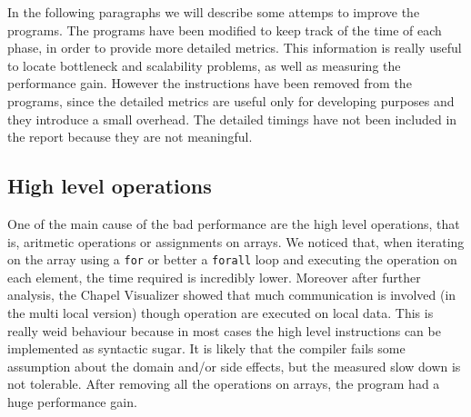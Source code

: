 \documentclass{article}
\begin{document}

In the following paragraphs we will describe some attemps to improve the programs. The programs have been modified to keep track of the time of each phase, in order to provide more detailed metrics. This information is really useful to locate bottleneck and scalability problems, as well as measuring the performance gain. However the instructions have been removed from the programs, since the detailed metrics are useful only for developing purposes and they introduce a small overhead. The detailed timings have not been included in the report because they are not meaningful.

\subsection{High level operations}
One of the main cause of the bad performance are the high level operations, that is, aritmetic operations or assignments on arrays. We noticed that, when iterating on the array using a \texttt{for} or better a \texttt{forall} loop and executing the operation on each element, the time required is incredibly lower. Moreover after further analysis, the Chapel Visualizer showed that much communication is involved (in the multi local version) though operation are executed on local data. This is really weid behaviour because in most cases the high level instructions can be implemented as syntactic sugar. It is likely that the compiler fails some assumption about the domain and/or side effects, but the measured slow down is not tolerable. After removing all the operations on arrays, the program had a huge performance gain.
\end{document}
